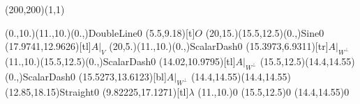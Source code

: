 \unitlength=1bp%

\begin{feynartspicture}(200,200)(1,1)

\FADiagram{}
\FAProp(0.,10.)(11.,10.)(0.,){DoubleLine}{0}
\FALabel(5.5,9.18)[t]{$O$}
\FAProp(20,15.)(15.5,12.5)(0.,){Sine}{0}
\FALabel(17.9741,12.9626)[tl]{$A|_V$}
\FAProp(20,5.)(11.,10.)(0.,){ScalarDash}{0}
\FALabel(15.3973,6.9311)[tr]{$A|_{W^\perp}$}
\FAProp(11.,10.)(15.5,12.5)(0.,){ScalarDash}{0}
\FALabel(14.02,10.9795)[tl]{$A|_{W^\perp}$}
\FAProp(15.5,12.5)(14.4,14.55)(0.,){ScalarDash}{0}
\FALabel(15.5273,13.6123)[bl]{$A|_{W^\perp}$}
\FAProp(14.4,14.55)(14.4,14.55)(12.85,18.15){Straight}{0}
\FALabel(9.82225,17.1271)[tl]{$\lambda$}
\FAVert(11.,10.){0}
\FAVert(15.5,12.5){0}
\FAVert(14.4,14.55){0}
\end{feynartspicture}

